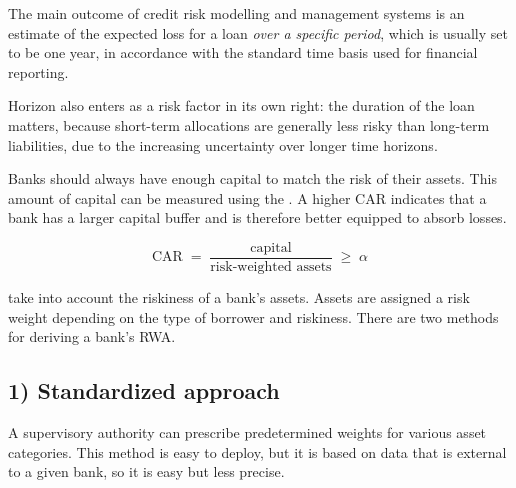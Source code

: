 \begin{crgapbox}
The main outcome of credit risk modelling and management systems is an estimate
of the expected loss for a loan \emph{over a specific period}, which is usually
set to be one year, in accordance with the standard time basis used for financial
reporting.

\smallskip
Horizon also enters as a risk factor in its own right: the duration of the loan
matters, because short-term allocations are generally less risky than long-term
liabilities, due to the increasing uncertainty over longer time horizons.
\end{crgapbox}


Banks should always have enough capital to match the risk of their assets. This
amount of capital can be measured using the .
A higher CAR indicates that a bank has a larger capital buffer and is therefore
better equipped to absorb losses.

\begin{crfmlbox}
\[ \mathrm{CAR} \;=\; \frac{\text{capital}}{\text{risk-weighted assets}} \;\geq\; \alpha \]
\end{crfmlbox}

 take into account the riskiness of a bank's
assets. Assets are assigned a risk weight depending on the type of borrower and
riskiness. There are two methods for deriving a bank's RWA.

\subsection*{1) Standardized approach}

A supervisory authority can prescribe predetermined weights for various asset
categories. This method is easy to deploy, but it is based on data that is
external to a given bank, so it is easy but less precise.

